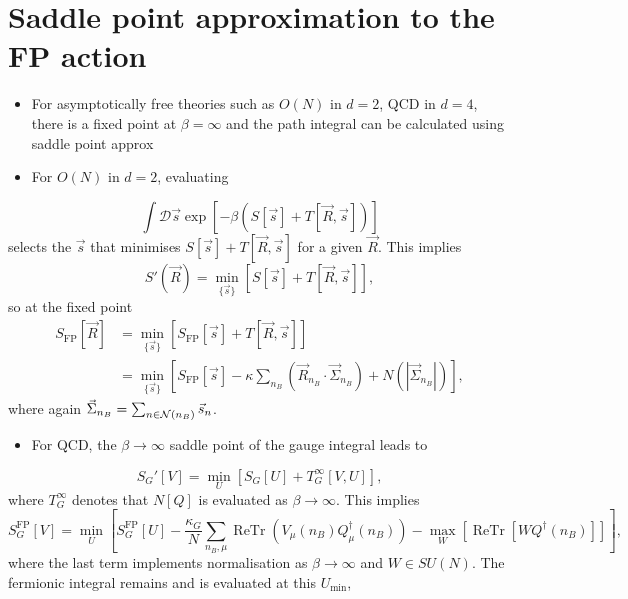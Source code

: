 \section{Saddle point approximation to the FP action}
\begin{itemize}
    \item For asymptotically free theories such as $O(N)$ in $d=2$, QCD in $d=4$, there is a fixed point at $\beta = \infty$ and the path integral can be calculated using saddle point approx
    \item For $O(N)$ in $d=2$, evaluating
\end{itemize}
\begin{equation}
    \int \mathcal{D}\vec{s} \exp[-\beta(S[\vec{s}]+T[\vec{R},\vec{s}])]
\end{equation}
selects the $\vec{s}$ that minimises $S[\vec{s}] + T[\vec{R}, \vec{s}]$ for a given $\vec{R}$. This implies
\begin{equation}
    S'(\vec{R}) = \min_{\{\vec{s}\}}[S[\vec{s}] + T[\vec{R}, \vec{s}]],
\end{equation}
so at the fixed point
\begin{align}
    S_\text{FP}[\vec{R}] &= \min_{\{\vec{s}\}}[S_\text{FP}[\vec{s}] + T[\vec{R}, \vec{s}]] \\
    &= \min_{\{\vec{s}\}}[S_\text{FP}[\vec{s}] - \kappa \sum_{n_B}(\vec{R}_{n_B} \cdot \vec{\Sigma}_{n_B}) + N(|\vec{\Sigma}_{n_B}|)],
\end{align}
where again $\vec{\Sigma}_{n_B} = \sum_{n \in {\cal N}(n_B)}\vec{s}_n$.
\begin{itemize}
    \item For QCD, the $\beta \to \infty$ saddle point of the gauge integral leads to
\end{itemize}
\begin{equation}
    S_G'[V] = \min_U [ S_G[U] + T_G^\infty[V,U]],
\end{equation}
where $T_G^\infty$ denotes that $N[Q]$ is evaluated as $\beta \to \infty$. This implies
\begin{equation}
\label{eq:saddle_point_gauge}
    S_G^\text{FP}[V] = \min_U \left[ S_G^\text{FP}[U] - \frac{\kappa_G}{N} \sum_{n_B, \mu} \operatorname{ReTr}(V_\mu(n_B) Q_\mu^\dagger(n_B)) - \max_W[\operatorname{ReTr}[WQ^\dagger(n_B)]]\right],
\end{equation}
where the last term implements normalisation as $\beta \to \infty$ and $W \in SU(N)$. The fermionic integral remains and is evaluated at this $U_\text{min}$,
